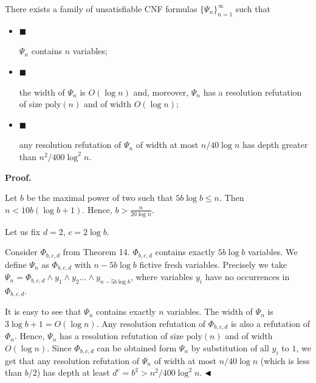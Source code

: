 \documentclass[10pt,a4paper]{article}
\begin{document}
There exists a family of unsatisfiable CNF formulas $\{\Psi_{n}\}_{n=1}^{\infty}$ such that\par


\begin{itemize}


\item 
$\blacksquare$ 


$\Psi_{n}$ contains $n$ variables;\par





\item 
$\blacksquare$ 


the width of $\Psi_{n}$ is $O(\log n)$ and, moreover,
$\Psi_{n}$ has a resolution refutation of size $\mathrm{poly}(n)$ and of
width $O(\log n)$;\par





\item 
$\blacksquare$ 


any resolution refutation of $\Psi_{n}$ of width at most $n/40\log n$
has depth greater than $n^{2}/400\log^{2}n$.\par





\end{itemize}



\par\medskip\noindent\textbf{Proof.}\par


Let $b$ be the maximal power of two such that $5b\log b\leq n$.
Then $n<10b(\log b+1)$. Hence, $b>\frac{n}{20\log n}$.\par



Let us fix $d=2$, $c=2\log b$.\par



Consider $\Phi_{b,c,d}$ from Theorem 14. $\Phi_{b,c,d}$
contains exactly $5b\log b$ variables. We define $\Psi_{n}$ as $\Phi_{b,c,d}$
with $n-5b\log b$ fictive fresh variables.
Precisely we take $\Psi_{n}=\Phi_{b,c,d}\land y_{1}\land y_{2}\dots\land y_{n-5b\log b}$,
where variables $y_{i}$ have no occurrences in $\Phi_{b,c,d}$.\par



It is easy to see that $\Psi_{n}$ contains exactly $n$ variables.
The width of $\Psi_{n}$ is $3\log b+1=O(\log n)$. Any resolution refutation of
$\Phi_{b,c,d}$ is also a refutation of $\Phi_{n}$.
Hence, $\Psi_{n}$ has a resolution refutation of size $\mathrm{poly}(n)$ and of width $O(\log n)$.
Since $\Phi_{b,c,d}$ can be obtained form $\Psi_{n}$ by substitution of all $y_{i}$ to $1$,
we get that any resolution refutation of $\Psi_{n}$ of width at most $n/40\log n$
(which is less than $b/2$) has depth at least $d^{c}=b^{2}>n^{2}/400\log^{2}n$.
$\hfill\blacktriangleleft$\par
\end{document}
